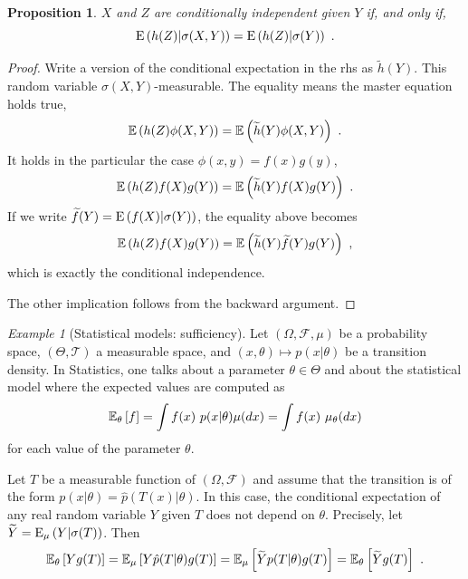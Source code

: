 \documentclass[12pt,a4paper]{amsart}
\theoremstyle{plain}%
\newtheorem{proposition}[thm]{Proposition}
\theoremstyle{definition}
\theoremstyle{remark}
\newtheorem{example}{Example}
\begin{document}
\begin{proposition}
  $X$ and $Z$ are conditionally independent given $Y$ if, and only if,
  \begin{equation*}
    \operatorname{E}\left(h(Z) \middle| \sigma(X,Y)\right) = \operatorname{E}\left(h(Z) \middle| \sigma(Y)\right) \ .
  \end{equation*}
\end{proposition}

\begin{proof}
Write  a version of the conditional expectation in the rhs as
$\widetilde h(Y)$. This random variable $\sigma(X,Y)$-measurable. The
equality means the master equation holds true,
\begin{equation*}
  \operatorname{\mathbb E}\left(h(Z)\phi(X,Y)\right) = \operatorname{\mathbb E}\left(\widetilde h(Y)\phi(X,Y)\right) \ . 
\end{equation*}
It holds in the particular the case $\phi(x,y) = f(x)g(y)$,
\begin{gather*}
    \operatorname{\mathbb E}\left(h(Z)f(X)g(Y)\right) = \operatorname{\mathbb E}\left(\widetilde h(Y)f(X)g(Y)\right) \ . 
  \end{gather*}
If we write $\widetilde f(Y) = \operatorname{E}\left(f(X) \middle| \sigma(Y)\right)$, the
equality above becomes
\begin{equation*}
     \operatorname{\mathbb E}\left(h(Z)f(X)g(Y)\right) = \operatorname{\mathbb E}\left(\widetilde h(Y)\widetilde f(Y)g(Y)\right) \ , 
\end{equation*}
which is exactly the conditional independence.

The other implication follows from the backward argument.
  \end{proof}

\begin{example}[Statistical models: sufficiency] Let $(\Omega,\mathcal
  F,\mu)$ be a probability space, $(\Theta,\mathcal T)$ a measurable
  space, and $(x,\theta) \mapsto p(x|\theta)$ be a transition
  density. In Statistics, one talks about a parameter $\theta \in
  \Theta$ and about the statistical model where the expected values are
  computed as
  \begin{equation*}
    \expectat \theta f = \int f(x) \ p(x|\theta)\mu(dx) = \int f(x) \
    \mu_\theta(dx)
  \end{equation*}
for each value of the parameter $\theta$.

Let $T$ be a measurable function of $(\Omega, \mathcal F)$ and
assume that the transition is of the form $p(x|\theta) = \hat
p(T(x)|\theta)$. In this case, the conditional expectation of any real random
variable $Y$ given $T$ does not depend on $\theta$. Precisely, let
$\widetilde Y = \operatorname{E}_{\mu}\left(Y \middle| \sigma(T)\right)$. Then
\begin{equation*}
  \operatorname{\mathbb E}_{\theta}\left[Yg(T)\right] = \operatorname{\mathbb E}_{\mu}\left[Y \hat p(T|\theta) g(T)\right] =
  \operatorname{\mathbb E}_{\mu}\left[\widetilde Y p(T|\theta) g(T)\right] = \operatorname{\mathbb E}_{\theta}\left[\widetilde Y g(T)\right] \ . 
\end{equation*}
\end{example}
\end{document}
